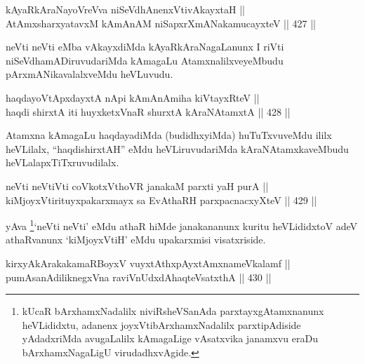 

\begin{shl}
kAyaRkAraNayoVreVva niSeVdhAnenxVtivAkayxtaH || \\
AtAmxsharxyatavxM kAmAnAM niSapxrXmANakamucayxteV \hfill || 427 ||  
\end{shl}

\begin{artha}
neVti neVti eMba vAkayxdiMda kAyaRkAraNagaLanunx I riVti
niSeVdhamADiruvudariMda kAmagaLu AtamxnalilxveyeMbudu
pArxmANikavalalxveMdu heVLuvudu.
\end{artha}


\begin{shl}
haqdayoVtApxdayxtA nApi kAmAnAmiha kiVtayxRteV || \\
haqdi shirxtA iti huyxketxVnaR shurxtA kAraNAtamxtA \hfill || 428 ||  
\end{shl}

\begin{artha}
Atamxna kAmagaLu haqdayadiMda (budidhxyiMda) huTuTxvuveMdu ililx
heVLilalx, ``haqdishirxtAH'' eMdu heVLiruvudariMda kAraNAtamxkaveMbudu
heVLalapxTiTxruvudilalx.
\end{artha}

\begin{shl}
neVti neVtiVti coVkotxV\s thoVR janakaM parxti yaH purA || \\
kiMjoyxVtirituyxpakarxmayx sa EvAthaRH parxpacnacxyXteV \hfill || 429 ||  
\end{shl}

\begin{artha}
yAva \footnote{kUcaR bArxhamxNadalilx niviRsheVSanAda
parxtayxgAtamxnanunx heVLididxtu, adanenx joyxVtibArxhamxNadalilx
parxtipAdiside yAdadxriMda avugaLalilx kAmagaLige vAsatxvika
janamxvu eraDu bArxhamxNagaLigU virudadhxvAgide.}`neVti neVti' eMdu athaR hiMde janakananunx kuritu heVLididxtoV
adeV athaRvanunx `kiMjoyxVtiH' eMdu upakarxmisi visatxriside. 
\end{artha}

\begin{shl}
kirxyAkArakakamaRBoyxV vuyxtAthxpAyx\s \s tAmxnameVkalamf || \\
pumAsanAdiliknegxVna raviVnUdxdAhaqteVsatxthA \hfill || 430 ||  
\end{shl}

